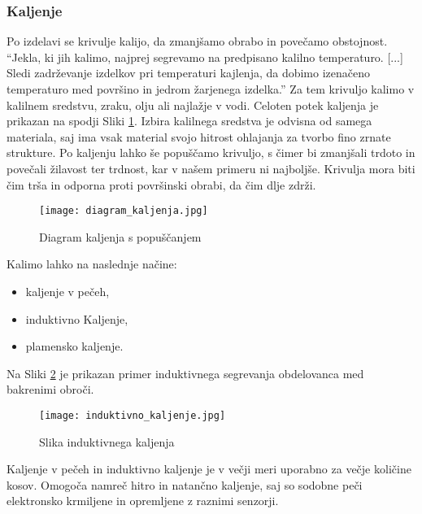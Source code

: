 \subsubsection{Kaljenje}
Po izdelavi se krivulje kalijo, da zmanjšamo obrabo in povečamo
obstojnost. \enquote{Jekla, ki jih kalimo, najprej segrevamo na predpisano
	kalilno temperaturo. [...] Sledi zadrževanje izdelkov pri temperaturi
	kajlenja, da dobimo izenačeno temperaturo med površino in jedrom
	žarjenega izdelka.} \cite{gradiva}
Za tem krivuljo kalimo v kalilnem sredstvu, zraku, olju ali najlažje
v vodi. Celoten potek kaljenja je prikazan na spodji Sliki \ref{diagram_kaljenja}.
Izbira kalilnega sredstva je odvisna od samega materiala,
saj ima vsak material svojo hitrost ohlajanja za tvorbo fino zrnate strukture.
Po kaljenju lahko še popuščamo krivuljo, s čimer bi zmanjšali trdoto
in povečali žilavost ter trdnost, kar v našem primeru ni najboljše.
Krivulja mora biti čim trša in odporna proti površinski obrabi,
da čim dlje zdrži.

\begin{figure}[H]
	\begin{center}
		\texttt{[image: diagram\_kaljenja.jpg]}
		\caption{Diagram kaljenja s popuščanjem
			\cite{diagram_kaljenja}}
		\label{diagram_kaljenja}
	\end{center}
\end{figure}

Kalimo lahko na naslednje načine:
\begin{itemize}
	\item kaljenje v pečeh,
	\item induktivno Kaljenje,
	\item plamensko kaljenje.
\end{itemize}

Na Sliki \ref{induktivno_kaljenje} je prikazan primer induktivnega
segrevanja obdelovanca med bakrenimi obroči.

\begin{figure}[H]
	\begin{center}
		\texttt{[image: induktivno\_kaljenje.jpg]}
		\caption{Slika induktivnega kaljenja
			\cite{induktivno_kaljenje}}
		\label{induktivno_kaljenje}
	\end{center}
\end{figure}

Kaljenje v pečeh in induktivno kaljenje je v večji meri uporabno
za večje količine kosov. Omogoča namreč hitro in natančno kaljenje,
saj so sodobne peči elektronsko krmiljene in opremljene z raznimi senzorji.

